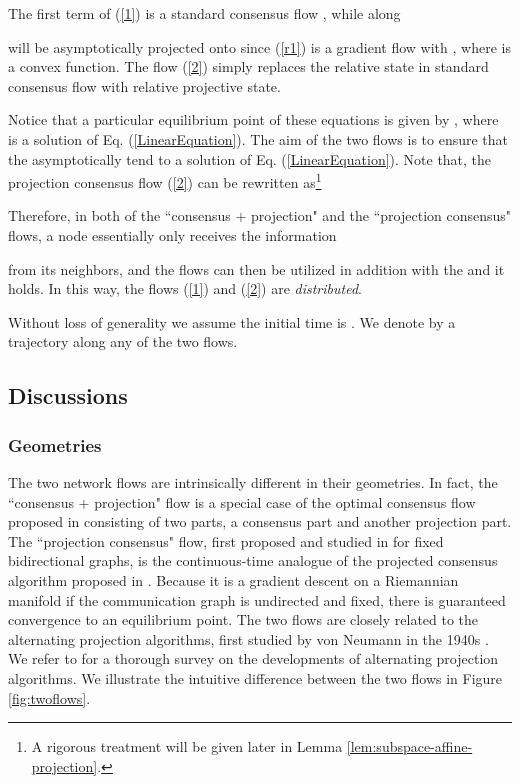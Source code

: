 \documentclass[a4paper, 11pt]{article}
\begin{document}
The first term of (\ref{1}) is a standard  consensus flow \cite{jad03}, while along

 will be asymptotically projected onto  since (\ref{r1}) is a gradient flow with , where  is a   convex function. The flow (\ref{2}) simply replaces the relative state in standard consensus flow with relative projective state.


Notice that a particular equilibrium point of these equations is given by  , where  is a solution of Eq. (\ref{LinearEquation}). The aim of the two flows is to ensure that the  asymptotically tend to a solution of Eq. (\ref{LinearEquation}). Note that, the projection consensus flow (\ref{2}) can be rewritten as\footnote{A rigorous treatment will be given later in Lemma \ref{lem:subspace-affine-projection}.}

Therefore, in both of the ``consensus + projection" and the  ``projection consensus" flows, a node  essentially only receives the information

from its  neighbors, and the flows can then be utilized in addition with the  and  it holds. In this way,   the  flows (\ref{1}) and (\ref{2}) are {\it distributed}.

Without loss of generality we assume the initial time is . We denote by   a trajectory along any of the two flows.

\subsection{Discussions}

\subsubsection{Geometries}
 The two network flows are intrinsically different in their geometries. In fact, the ``consensus + projection" flow  is a special case of the optimal consensus flow proposed in \cite{shitac} consisting of two parts, a consensus part and another projection part. The ``projection consensus" flow, first  proposed and studied in \cite{brian15} for fixed bidirectional graphs,  is the continuous-time analogue of the projected consensus algorithm   proposed in \cite{nedic10}. Because it is a gradient descent on a Riemannian manifold if the communication graph is undirected and fixed, there is guaranteed convergence to an equilibrium point.  The two flows are closely related to the alternating projection algorithms,  first studied by von Neumann in the 1940s \cite{jvn49}. We refer to  \cite{B-B-SIAM} for a thorough survey on the developments of alternating projection algorithms. We illustrate the intuitive  difference between the two flows in Figure \ref{fig:twoflows}.
\end{document}
